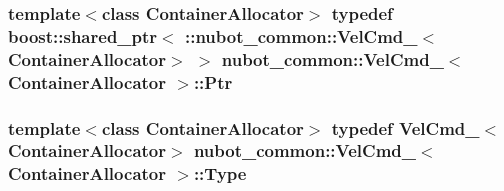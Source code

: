 \hypertarget{structnubot__common_1_1VelCmd___a860a08539c646e06eb0cc72688531edc}{
\subsubsection[{Ptr}]{\setlength{\rightskip}{0pt plus 5cm}template$<$class Container\-Allocator$>$ typedef boost\-::shared\-\_\-ptr$<$ \-::{\bf nubot\-\_\-common\-::\-Vel\-Cmd\-\_\-}$<$Container\-Allocator$>$ $>$ {\bf nubot\-\_\-common\-::\-Vel\-Cmd\-\_\-}$<$ Container\-Allocator $>$\-::{\bf Ptr}}}\label{structnubot__common_1_1VelCmd___a860a08539c646e06eb0cc72688531edc}
\hypertarget{structnubot__common_1_1VelCmd___a6986d19cbdcd3c0bb75e68ffea5b7886}{
\subsubsection[{Type}]{\setlength{\rightskip}{0pt plus 5cm}template$<$class Container\-Allocator$>$ typedef {\bf Vel\-Cmd\-\_\-}$<$Container\-Allocator$>$ {\bf nubot\-\_\-common\-::\-Vel\-Cmd\-\_\-}$<$ Container\-Allocator $>$\-::{\bf Type}}}\label{structnubot__common_1_1VelCmd___a6986d19cbdcd3c0bb75e68ffea5b7886}


